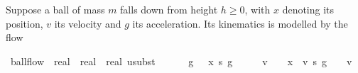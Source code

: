 \documentclass[envcountsame,envcountsect]{llncs}
\begin{document}
\begin{example}\label{ex:ball-hoare}
  Suppose a ball of mass $m$ falls down from height $h\geq 0$, with
  $x$ denoting its position, $v$ its velocity and $g$ its
  acceleration. Its kinematics is modelled by the flow
\begin{isabellebody}
\isanewline
{}\isamarkupfalse%
\ ball{\isacharunderscore}flow\ {\isacharcolon}{\isacharcolon}\ {\isachardoublequoteopen}real\ {\isasymRightarrow}\ real\ {\isasymRightarrow}\ {\isacharparenleft}real{\isacharcircum}{}{\isacharparenright}\ usubst{\isachardoublequoteclose}\ {\isacharparenleft}{\isachardoublequoteopen}{\isasymphi}{\isachardoublequoteclose}{\isacharparenright}\ \isanewline
\ \ \ {\isachardoublequoteopen}{\isasymphi}\ g\ {\isasymtau}\ {\isasymequiv}\ {\isacharbrackleft}x\ {\isasymmapsto}\isactrlsub s\ g\ {\isasymcdot}\ {\isasymtau}\ {\isacharcircum}\ {}{\isacharslash}{}\ {\isacharplus}\ v\ {\isasymcdot}\ {\isasymtau}\ {\isacharplus}\ x{\isacharcomma}\ \ v\ {\isasymmapsto}\isactrlsub s\ g\ {\isasymcdot}\ {\isasymtau}\ {\isacharplus}\ v{\isacharbrackright}{\isachardoublequoteclose}\isanewline
\end{isabellebody}


\end{example}
\end{document}

